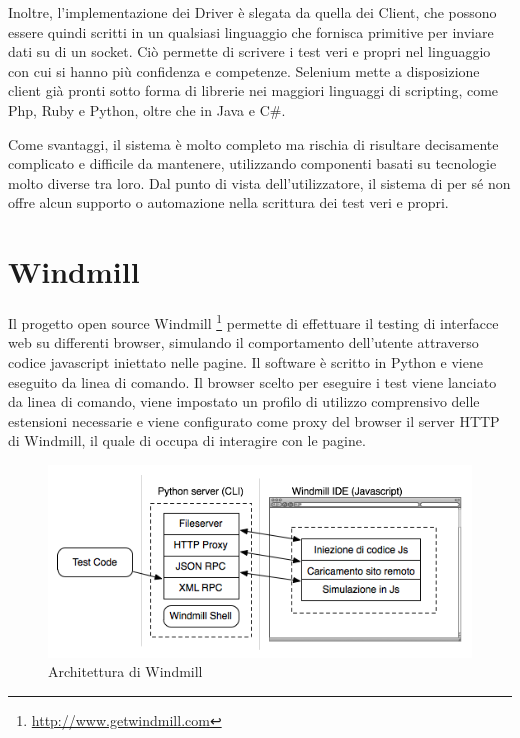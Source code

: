 Inoltre, l'implementazione dei Driver è slegata da quella dei Client, che possono essere quindi scritti in un qualsiasi linguaggio che fornisca primitive per inviare dati su di un socket. Ciò permette di scrivere i test veri e propri nel linguaggio con cui si hanno più confidenza e competenze. Selenium mette a disposizione client già pronti sotto forma di librerie nei maggiori linguaggi di scripting, come Php, Ruby e Python, oltre che in Java e C\#.

Come svantaggi, il sistema è molto completo ma rischia di risultare decisamente complicato e difficile da mantenere, utilizzando componenti basati su tecnologie molto diverse tra loro. Dal punto di vista dell'utilizzatore, il sistema di per sé non offre alcun supporto o automazione nella scrittura dei test veri e propri. 

\section{Windmill}

Il progetto open source Windmill \footnote{\url{http://www.getwindmill.com}} permette di effettuare il testing di interfacce web su differenti browser, simulando il comportamento dell'utente attraverso codice javascript iniettato nelle pagine. Il software è scritto in Python e viene eseguito da linea di comando. Il browser scelto per eseguire i test viene lanciato da linea di comando, viene impostato un profilo di utilizzo comprensivo delle estensioni necessarie e viene configurato come proxy del browser il server HTTP di Windmill, il quale di occupa di interagire con le pagine. 

\begin{figure}[htbp]
\begin{center}
\includegraphics[width=\textwidth]{images/windmill_architecture.png}
\caption{Architettura di Windmill}
\label{fig:windmillArchitecture}
\end{center}
\end{figure}

